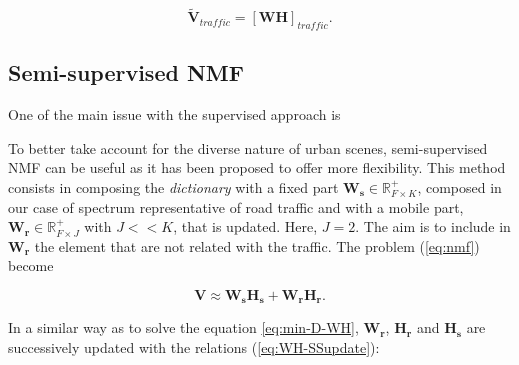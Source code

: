 \documentclass[twocolumn,a4paper,10pt]{article}
\begin{document}
\begin{equation}\label{eq:separationExtraction}
\mathbf{\tilde{V}}_{traffic} = \left[ \mathbf{WH} \right]_{traffic}.
\end{equation}

%
%
%

\subsection{Semi-supervised NMF}

One of the main issue with the supervised approach is 

To better take account for the diverse nature of urban scenes, semi-supervised NMF can be useful as it has been proposed \cite{lee_semi-supervised_2010} to offer more flexibility. This method consists in composing the \textit{dictionary} with a fixed part $\mathbf{W_s} \in \mathbb{R}^+_{F\times K}$, composed in our case of spectrum representative of road traffic and with a mobile part, $\mathbf{W_r} \in \mathbb{R}^+_{F\times J}$ with $J <<K$, that is updated. Here, $J = 2$. The aim is to include in $\mathbf{W_r}$ the element that are not related with the traffic. The problem (\ref{eq:nmf}) become

\begin{equation}
\mathbf{V} \approx \mathbf{W_s H_s}+ \mathbf{W_r H_r}.
\end{equation}

In a similar way as to solve the equation \ref{eq:min-D-WH}, $\mathbf{W_r}$, $\mathbf{H_r}$ and $\mathbf{H_s}$ are successively updated with the relations (\ref{eq:WH-SSupdate}):
\end{document}
